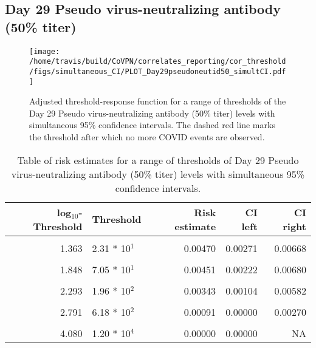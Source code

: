 \documentclass[]{book}
\theoremstyle{definition}
\theoremstyle{definition}
\theoremstyle{definition}
\newcommand{\1}{\mathbbm{1}}
\begin{document}
\clearpage

\clearpage

\clearpage

\hypertarget{day-29-pseudo-virus-neutralizing-antibody-50-titer-2}{%
\subsection{Day 29 Pseudo virus-neutralizing antibody (50\% titer)}\label{day-29-pseudo-virus-neutralizing-antibody-50-titer-2}}

\begin{figure}[H]
\centering
\texttt{[image: /home/travis/build/CoVPN/correlates\_reporting/cor\_threshold/figs/simultaneous\_CI/PLOT\_Day29pseudoneutid50\_simultCI.pdf]}
\caption{Adjusted threshold-response function for a range of thresholds of the
  Day 29 Pseudo virus-neutralizing antibody (50\% titer) levels with simultaneous 95\% confidence intervals. The dashed red line marks the threshold after which no more COVID events are observed. }
\end{figure}
\begin{table}[!h]

\caption{\label{tab:unnamed-chunk-391}Table of risk estimates for a range of thresholds of Day 29 Pseudo virus-neutralizing antibody (50\% titer) levels with simultaneous 95\% confidence intervals.}
\centering
\begin{tabular}[t]{rlrrr}
\toprule
log$_{10}$-Threshold & Threshold & Risk estimate & CI left & CI right\\
\midrule
\cellcolor{gray!6}{0.699} & \cellcolor{gray!6}{5.00 * 10$^0$} & \cellcolor{gray!6}{0.00585} & \cellcolor{gray!6}{0.00382} & \cellcolor{gray!6}{0.00788}\\
1.363 & 2.31 * 10$^1$ & 0.00470 & 0.00271 & 0.00668\\
\cellcolor{gray!6}{1.628} & \cellcolor{gray!6}{4.25 * 10$^1$} & \cellcolor{gray!6}{0.00469} & \cellcolor{gray!6}{0.00254} & \cellcolor{gray!6}{0.00683}\\
1.848 & 7.05 * 10$^1$ & 0.00451 & 0.00222 & 0.00680\\
\cellcolor{gray!6}{2.078} & \cellcolor{gray!6}{1.20 * 10$^2$} & \cellcolor{gray!6}{0.00399} & \cellcolor{gray!6}{0.00168} & \cellcolor{gray!6}{0.00630}\\
2.293 & 1.96 * 10$^2$ & 0.00343 & 0.00104 & 0.00582\\
\cellcolor{gray!6}{2.537} & \cellcolor{gray!6}{3.44 * 10$^2$} & \cellcolor{gray!6}{0.00143} & \cellcolor{gray!6}{0.00000} & \cellcolor{gray!6}{0.00323}\\
2.791 & 6.18 * 10$^2$ & 0.00091 & 0.00000 & 0.00270\\
\cellcolor{gray!6}{3.109} & \cellcolor{gray!6}{1.29 * 10$^3$} & \cellcolor{gray!6}{0.00199} & \cellcolor{gray!6}{0.00000} & \cellcolor{gray!6}{0.00601}\\
4.080 & 1.20 * 10$^4$ & 0.00000 & 0.00000 & NA\\
\bottomrule
\end{tabular}
\end{table}
\end{document}

